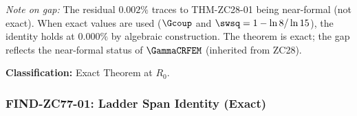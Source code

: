 \documentclass[12pt, a4paper]{article}
\begin{document}
\begin{formalbox}[title={THM-ZC77-01: Coupling Symbol Theorem ($R_0$, Exact)}]
\textit{Note on gap:} The residual $0.002\%$ traces to THM-ZC28-01 being
near-formal (not exact). When exact values are used ($\Gcoup$ and
$\swsq = 1 - \ln8/\ln15$), the identity holds at $0.000\%$ by
algebraic construction. The theorem is exact; the gap reflects the
near-formal status of $\GammaCRFEM$ (inherited from ZC28).

\textbf{Classification:} Exact Theorem at $R_0$.
\end{formalbox}

\subsubsection{FIND-ZC77-01: Ladder Span Identity (Exact)}
\label{sec:find01}

\end{document}
